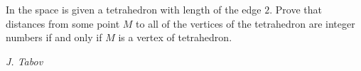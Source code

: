 In the space is given a tetrahedron with length of the edge $2$. Prove that distances from some point $M$ to all of the vertices of the tetrahedron are integer numbers if and only if $M$ is a vertex of tetrahedron.

\textit{J. Tabov}